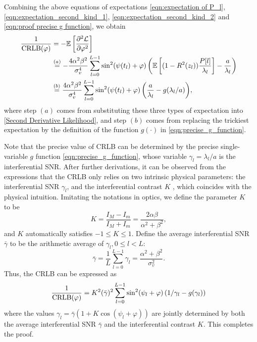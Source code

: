 \documentclass[12pt,draftclsnofoot,journal,onecolumn]{IEEEtran}
\theoremstyle{nonumberplain}
\begin{document}
    Combining the above equations of expectations \eqref{eqn:expectation of P_l}, \eqref{eqn:expectation_second_kind_1}, \eqref{eqn:expectation_second_kind_2} and \eqref{eqn:proof precise g function}, we obtain
    \begin{equation}
        \begin{aligned}
        \frac{1}{{\rm CRLB}(\varphi)} & = -\mathbb{E}\left[\frac{\partial^2\mathcal{L}}{\partial\varphi^2}\right] \\
        & \overset{(a)}{=}  -\frac{4\alpha^2\beta^2}{\sigma_v^4}\sum_{l=0}^{L-1}{ \sin^2(\psi(t_l)+\varphi) \left(\mathbb{E}\left[(1-R^2(z_l))\frac{P[l]}{\lambda_l}\right] - \frac{a}{\lambda_l}\right) } \\
        & \overset{(b)}{=} \frac{4\alpha^2\beta^2}{\sigma_v^4}\sum_{l=0}^{L-1}{ \sin^2(\psi(t_l)+\varphi) \left(\frac{a}{\lambda_l}-g(\lambda_l/a)\right)},
        \end{aligned}
        \label{eqn:CRLB}
    \end{equation}
    where step $(a)$ comes from substituting these three types of expectation into \eqref{Second Derivative Likelihood}, and step $(b)$ comes from replacing the trickiest expectation by the definition of the function $g(\cdot)$ in \eqref{eqn:precise_g_function}.  
    
    Note that the precise value of CRLB can be determined by the precise single-variable $g$ function \eqref{eqn:precise_g_function}, whose variable $\gamma_l = \lambda_l / a$ is the interferential SNR. After further derivations, it can be observed from the expressions that the CRLB only relies on two intrinsic physical parameters: the interferential SNR $\gamma_l$, and the interferential contrast $K$ \cite{louradour1993interference}, which coincides with the physical intuition. Imitating the notations in optics, we define the parameter $K$ to be  
    \begin{equation}
        K = \frac{I_M - I_m}{I_M + I_m} = \frac{2\alpha\beta}{\alpha^2+\beta^2},
    \end{equation}
    and $K$ automatically satisfies $-1\leq K\leq 1$. Define the average interferential SNR $\bar{\gamma}$ to be the arithmetic average of $\gamma_l, 0\leq l < L$:
    \begin{equation}
        \bar{\gamma} = \frac{1}{L}\sum_{l=0}^{L-1}{\gamma_l} = \frac{\alpha^2+\beta^2}{\sigma_v^2}.
    \end{equation}
    Thus, the CRLB can be expressed as 
    \begin{equation}
        \frac{1}{{\rm CRLB}(\varphi)} = K^2(\bar{\gamma})^2 \sum_{l=0}^{L-1}{ \sin^2(\psi_l+\varphi) \left(1/\gamma_l-g(\gamma_l)\right) }
    \end{equation}
    where the values $\gamma_l=\bar{\gamma}\left(1+K\cos(\psi_l+\varphi)\right)$ are jointly determined by both the average interferential SNR $\bar{\gamma}$ and the interferential contrast $K$. This completes the proof.
\end{document}

